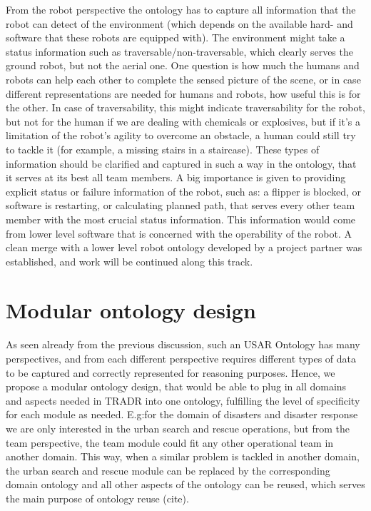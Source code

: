 \begin{itemize}
\begin{itemize}
From the robot perspective the ontology has to capture all information that the robot can detect of the environment (which depends on the available hard- and software that these robots are equipped with). The environment might take a status information such as traversable/non-traversable, which clearly serves the ground robot, but not the aerial one. One question is how much the humans and robots can help each other to complete the sensed picture of the scene, or in case different representations are needed for humans and robots, how useful this is for the other. In case of traversability, this might indicate traversability for the robot, but not for the human if we are dealing with chemicals or explosives, but if it's a limitation of the robot's agility to overcome an obstacle, a human could still try to tackle it (for example, a missing stairs in a staircase). These types of information should be clarified and captured in such a way in the ontology, that it serves at its best all team members.
A big importance is given to providing explicit status or failure information of the robot, such as: a flipper is blocked, or software is restarting, or calculating planned path, that serves every other team member with the most crucial status information. This information would come from lower level software that is concerned with the operability of the robot. A clean merge with a lower level robot ontology developed by a project partner was established, and work will be continued along this track.
\end{itemize}


\section{Modular ontology design}

As seen already from the previous discussion, such an USAR Ontology has many perspectives, and from each different perspective requires different types of data to be captured and correctly represented for reasoning purposes. Hence, we propose a modular ontology design, that would be able to plug in all domains and aspects needed in TRADR into one ontology, fulfilling the level of specificity for each module as needed. E.g:for the domain of disasters and disaster response we are only interested in the urban search and rescue operations, but from the team perspective, the team module could fit any other operational team in another domain. This way, when a similar problem is tackled in another domain, the urban search and rescue module can be replaced by the corresponding domain ontology and all other aspects of the ontology can be reused, which serves the main purpose of ontology reuse (cite).



\end{itemize}
